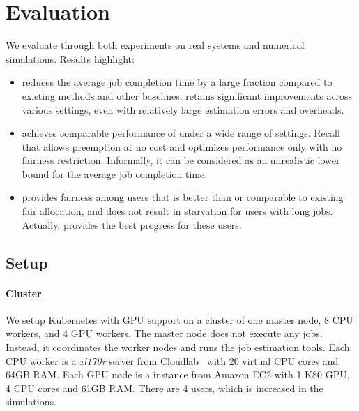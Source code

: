 \section{Evaluation}
\label{sec:evaluation}

We evaluate \name through both experiments on real systems and numerical simulations. Results highlight:
\begin{itemize}
	\item \name reduces the average job completion time by a large fraction compared to existing methods and other baselines. \name retains significant improvements across various settings, even with relatively large estimation errors and overheads. 
	\item \name achieves comparable performance of \SRPT under a wide range of settings. Recall that \SRPT allows preemption at no cost and optimizes performance only with no fairness restriction. Informally, it can be considered as an unrealistic lower bound for the average job completion time.  
    \item \name provides fairness among users that is better than or comparable to existing fair allocation, and does not result in starvation for users with long jobs. Actually, \name provides the best progress for these users. 
\end{itemize}

\subsection{Setup}

\paragraph{Cluster} We setup Kubernetes with GPU support on a cluster of one master node, 8 CPU workers, and 4 GPU workers.
The master node does not execute any jobs. Instead, it coordinates the worker nodes and runs the job estimation tools. 
Each CPU worker is a \textit{xl170r} server from Cloudlab~\cite{cloudlab} with 20 virtual CPU cores and 64GB RAM.
Each GPU node is a  instance from Amazon EC2 with 1 K80 GPU, 4 CPU cores and 61GB RAM.
There are 4 users, which is increased in the simulations.

